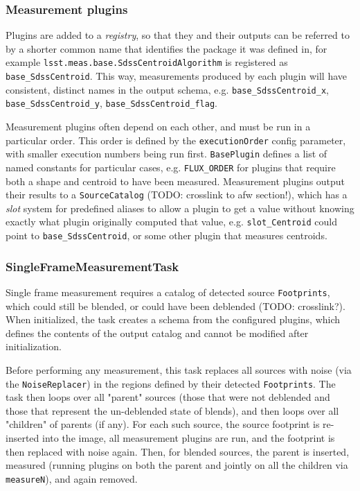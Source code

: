 \subsubsection{Measurement plugins}
\label{sec:plugins}

Plugins are added to a \textit{registry}, so that they and their outputs can be referred to by a shorter common name that identifies the package it was defined in, for example \texttt{lsst.meas.base.SdssCentroidAlgorithm} is registered as \texttt{base\_SdssCentroid}.
This way, measurements produced by each plugin will have consistent, distinct names in the output schema, e.g. \texttt{base\_SdssCentroid\_x}, \texttt{base\_SdssCentroid\_y}, \texttt{base\_SdssCentroid\_flag}.

Measurement plugins often depend on each other, and must be run in a particular order.
This order is defined by the \texttt{executionOrder} config parameter, with smaller execution numbers being run first.
\texttt{BasePlugin} defines a list of named constants for particular cases, e.g. \texttt{FLUX\_ORDER} for plugins that require both a shape and centroid to have been measured.
Measurement plugins output their results to a \texttt{SourceCatalog} (TODO: crosslink to afw section!), which has a \textit{slot} system for predefined aliases to allow a plugin to get a value without knowing exactly what plugin originally computed that value, e.g. \texttt{slot\_Centroid} could point to \texttt{base\_SdssCentroid}, or some other plugin that measures centroids.

\subsubsection{SingleFrameMeasurementTask}
\label{sec:SingleFrameMeasurementTask}

Single frame measurement requires a catalog of detected source \texttt{Footprints}, which could still be blended, or could have been deblended (TODO: crosslink?).
When initialized, the task creates a schema from the configured plugins, which defines the contents of the output catalog and cannot be modified after initialization.

Before performing any measurement, this task replaces all sources with noise (via the \texttt{NoiseReplacer}) in the regions defined by their detected \texttt{Footprints}.
The task then loops over all "parent" sources (those that were not deblended and those that represent the un-deblended state of blends), and then loops over all "children" of parents (if any).
For each such source, the source footprint is re-inserted into the image, all measurement plugins are run, and the footprint is then replaced with noise again.
Then, for blended sources, the parent is inserted, measured (running plugins on both the parent and jointly on all the children via \texttt{measureN}), and again removed.

